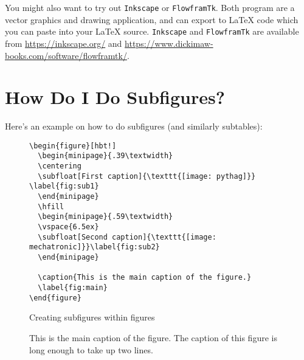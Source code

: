 You might also want to try out \texttt{Inkscape} or \texttt{FlowframTk}. Both program are a vector graphics and drawing application, and can export to \LaTeX{} code which you can paste into your \LaTeX{} source. \texttt{Inkscape} and \texttt{FlowframTk} are available from \url{https://inkscape.org/} and \url{https://www.dickimaw-books.com/software/flowframtk/}.

\section{How Do I Do Subfigures?}
Here's an example on how to do subfigures (and similarly subtables):

\begin{figure}[hbt!]
\begin{lstlisting}
\begin{figure}[hbt!]
  \begin{minipage}{.39\textwidth}
  \centering
  \subfloat[First caption]{\texttt{[image: pythag]}} \label{fig:sub1}
  \end{minipage}
  \hfill
  \begin{minipage}{.59\textwidth}	
  \vspace{6.5ex}
  \subfloat[Second caption]{\texttt{[image: mechatronic]}}\label{fig:sub2}
  \end{minipage}
  
  \caption{This is the main caption of the figure.}
  \label{fig:main}
\end{figure}
\end{lstlisting}
\caption{Creating subfigures within figures}
\end{figure}

\begin{figure}[hbt!]
  \begin{minipage}{.39\textwidth}
  \centering
   \label{fig:sub1}
  \end{minipage}
  \hfill
  \begin{minipage}{.59\textwidth}	
  \vspace{6.5ex}
  \label{fig:sub2}
  \end{minipage}
  
  \caption{This is the main caption of the figure. The caption of this figure is long enough to take up two lines.}
  \label{fig:main}
\end{figure}


